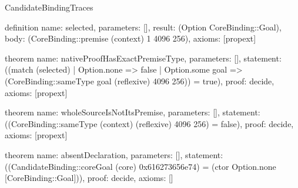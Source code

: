 \begin{lexlean}{CandidateBindingTraces}
\begin{semanticmodule}
definition{
 name: selected,
 parameters: [],
 result: (Option CoreBinding::Goal),
 body: (CoreBinding::premise (context) 1 4096 256),
 axioms: [propext]
}

theorem{
 name: nativeProofHasExactPremiseType,
 parameters: [],
 statement: ((match (selected) | Option.none => false | Option.some goal => (CoreBinding::sameType goal (reflexive) 4096 256)) = true),
 proof: decide{},
 axioms: [propext]
}

theorem{
 name: wholeSourceIsNotItsPremise,
 parameters: [],
 statement: ((CoreBinding::sameType (context) (reflexive) 4096 256) = false),
 proof: decide{},
 axioms: [propext]
}

theorem{
 name: absentDeclaration,
 parameters: [],
 statement: ((CandidateBinding::coreGoal (core) 0x616273656e74) = (ctor Option.none [CoreBinding::Goal])),
 proof: decide{},
 axioms: []
}


\end{semanticmodule}
\end{lexlean}
